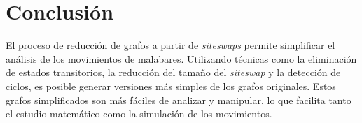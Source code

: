 \documentclass[a4paper,12pt]{article}
\begin{document}
\section{Conclusión}

El proceso de reducción de grafos a partir de \emph{siteswaps} permite simplificar el análisis de los movimientos de malabares. Utilizando técnicas como la eliminación de estados transitorios, la reducción del tamaño del \emph{siteswap} y la detección de ciclos, es posible generar versiones más simples de los grafos originales. Estos grafos simplificados son más fáciles de analizar y manipular, lo que facilita tanto el estudio matemático como la simulación de los movimientos.
\end{document}
